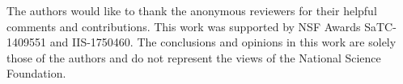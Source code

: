
The authors would like to thank the anonymous reviewers for their helpful comments and contributions. This work was supported by NSF Awards SaTC-1409551 and IIS-1750460. The conclusions and opinions in this work are solely those of the authors and do not represent the views of the National Science Foundation.